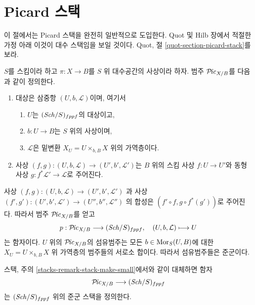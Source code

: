 \section{Picard 스택}
\label{section-picard-stack}

\noindent
이 절에서는 Picard 스택을 완전히 일반적으로 도입한다. Quot 및 Hilb 장에서
적절한 가정 아래 이것이 대수 스택임을 보일 것이다. Quot, 절
\ref{quot-section-picard-stack}를 보라.

\medskip\noindent
$S$를 스킴이라 하고 $\pi : X \to B$를 $S$ 위 대수공간의 사상이라 하자.
범주 $\mathcal{P}\!\mathit{ic}_{X/B}$를 다음과 같이 정의한다.
\begin{enumerate}
\item 대상은 삼중항 $(U, b, \mathcal{L})$이며, 여기서
\begin{enumerate}
\item $U$는 $(\mathit{Sch}/S)_{fppf}$의 대상이고,
\item $b : U \to B$는 $S$ 위의 사상이며,
\item $\mathcal{L}$은 밑변환 $X_U = U \times_{b, B} X$ 위의 가역층이다.
\end{enumerate}
\item 사상 $(f, g) : (U, b, \mathcal{L}) \to (U', b', \mathcal{L}')$는
$B$ 위의 스킴 사상 $f : U \to U'$와 동형사상
$g : f^*\mathcal{L}' \to \mathcal{L}$로 주어진다.
\end{enumerate}
사상
$(f, g) : (U, b, \mathcal{L}) \to (U', b', \mathcal{L}')$
과 사상
$(f', g') : (U', b', \mathcal{L}') \to (U'', b'', \mathcal{L}'')$
의 합성은 $(f' \circ f, g \circ f^*(g'))$로 주어진다. 따라서 범주
$\mathcal{P}\!\mathit{ic}_{X/B}$를 얻고
$$
p : \mathcal{P}\!\mathit{ic}_{X/B} \longrightarrow (\mathit{Sch}/S)_{fppf},
\quad
(U, b, \mathcal{L}) \longmapsto U
$$
는 함자이다. $U$ 위의 $\mathcal{P}\!\mathit{ic}_{X/B}$의 섬유범주는 모든
$b \in \mathop{\mathrm{Mor}}\nolimits_S(U, B)$에 대한 $X_U = U \times_{b, B} X$ 위 가역층의 범주들의
서로소 합이다. 따라서 섬유범주들은 준군이다.

\begin{lemma}
\label{lemma-picard-stack}
스택, 주의 \ref{stacks-remark-stack-make-small}에서와 같이 대체하면 함자
$$
\mathcal{P}\!\mathit{ic}_{X/B} \longrightarrow (\mathit{Sch}/S)_{fppf}
$$
는 $(\mathit{Sch}/S)_{fppf}$ 위의 준군 스택을 정의한다.
\end{lemma}

